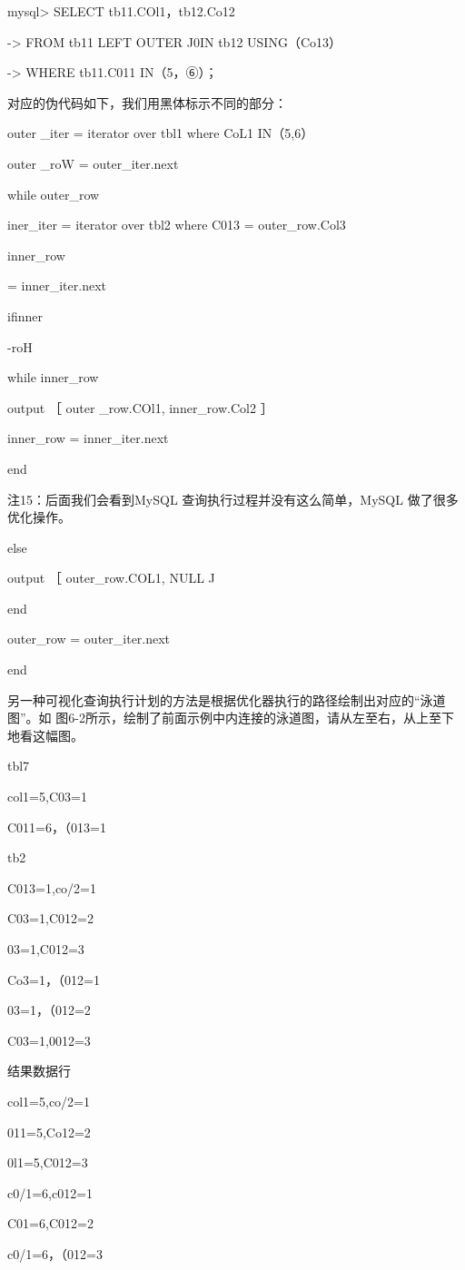mysql> SELECT tb11.COl1，tb12.Co12

-> FROM tb11 LEFT OUTER J0IN tb12 USING（Co13）

-> WHERE tb11.C011 IN（5，⑥）；

对应的伪代码如下，我们用黑体标示不同的部分：

outer \_iter = iterator over tbl1 where CoL1 IN（5,6）

outer \_roW = outer\_iter.next

while outer\_row

iner\_iter = iterator over tbl2 where C013 = outer\_row.Col3

inner\_row

= inner\_iter.next

ifinner

-roH

while inner\_row

output ［ outer \_row.COl1, inner\_row.Col2 ］

inner\_row = inner\_iter.next

end

注15：后面我们会看到MySQL 查询执行过程并没有这么简单，MySQL 做了很多优化操作。

else

output ［ outer\_row.COL1, NULL J

end

outer\_row = outer\_iter.next

end

另一种可视化查询执行计划的方法是根据优化器执行的路径绘制出对应的“泳道图”。如
图6-2所示，绘制了前面示例中内连接的泳道图，请从左至右，从上至下地看这幅图。

tbl7

col1=5,C03=1

C011=6，（013=1

tb2

C013=1,co/2=1

C03=1,C012=2

03=1,C012=3

Co3=1，（012=1

03=1，（012=2

C03=1,0012=3

结果数据行

col1=5,co/2=1

011=5,Co12=2

0l1=5,C012=3

c0/1=6,c012=1

C01=6,C012=2

c0/1=6，（012=3

